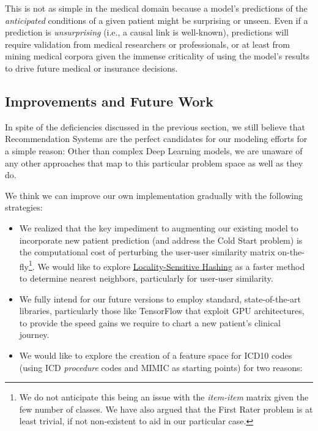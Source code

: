 \documentclass[twoside,11pt]{article}
\newcommand*\circled[1]{\tikz[baseline=(char.base)]{
            \node[shape=circle,draw,inner sep=1pt] (char) {#1};}}
\begin{document}
{This is not as simple in the medical domain because a model's predictions of the \textit{anticipated} conditions of a given patient might be surprising or unseen. Even if a prediction is \textit{unsurprising} (i.e., a causal link is well-known), predictions will require validation \circled{1} from medical researchers or professionals, or at least \circled{2} from mining medical corpora given the immense criticality of using the model's results to drive future medical or insurance decisions.
\newpage
\subsection{Improvements and Future Work}

In spite of the deficiencies discussed in the previous section, we still believe that Recommendation Systems are the perfect candidates for our modeling efforts for a simple reason: Other than complex Deep Learning models, we are unaware of any other approaches that map to this particular problem space as well as they do.

We think we can improve our own implementation gradually with the following strategies:
\begin{itemize}

  \item We realized that the key impediment to augmenting our existing model to incorporate new patient prediction (and address the Cold Start problem) is the computational cost of perturbing the user-user similarity matrix on-the-fly\footnote{We do not anticipate this being an issue with the \textit{item-item} matrix given the few number of classes. We have also argued that the First Rater problem is at least trivial, if not non-existent to aid in our particular case.}. We would like to explore \href{https://en.wikipedia.org/wiki/Locality-sensitive_hashing}{Locality-Sensitive Hashing} as a faster method to determine nearest neighbors, particularly for user-user similarity.

  \item We fully intend for our future versions to employ standard, state-of-the-art libraries, particularly those like TensorFlow that exploit GPU architectures, to provide the speed gains we require to chart a new patient's clinical journey.

  \item We would like to explore the creation of a feature space for ICD10 codes (using ICD \textit{procedure} codes and MIMIC as starting points) for two reasons:


\end{itemize}}
\end{document}
